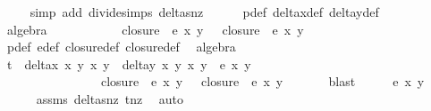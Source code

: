 \begin{isabellebody}
\ \ \ \ \isamarkupfalse%
{\isacharparenleft}simp\ add{\isacharcolon}\ divide{\isacharunderscore}simps\ deltas{\isacharunderscore}nz{\isacharparenright}\isanewline
\ \ \ \ \isamarkupfalse%
\ p{\isacharunderscore}def\ delta{\isacharunderscore}x{\isacharunderscore}def\ delta{\isacharunderscore}y{\isacharunderscore}def\isanewline
\ \ \ \ \isamarkupfalse%
\ algebra\ \ \ \ \isanewline
\ \ \isamarkupfalse%
\ \isamarkupfalse%
\ {\isachardoublequoteopen}{\isachardot}{\isachardot}{\isachardot}\ {\isacharequal}\ closure{}\ {\isacharasterisk}\ e{\isacharprime}\ x{}\ y{}\ {\isacharplus}\ \ closure{}\ {\isacharasterisk}\ e{\isacharprime}\ x{}\ y{}{\isachardoublequoteclose}\isanewline
\ \ \ \ \isamarkupfalse%
\ p{\isacharunderscore}def\ e{\isacharprime}{\isacharunderscore}def\ closure{}{\isacharunderscore}def\ closure{}{\isacharunderscore}def\ \isamarkupfalse%
\ algebra\isanewline
\ \ \isamarkupfalse%
\ \isamarkupfalse%
\ {\isachardoublequoteopen}t{\isacharcircum}{}\ {\isacharasterisk}\ {\isacharparenleft}delta{\isacharunderscore}x\ x{}\ y{}\ x{}\ y{}{\isacharparenright}{\isacharcircum}{}\ {\isacharasterisk}\ {\isacharparenleft}delta{\isacharunderscore}y\ x{}\ y{}\ x{}\ y{}{\isacharparenright}{\isacharcircum}{}\ {\isacharasterisk}\ e{\isacharprime}\ x{}\ y{}\ {\isacharequal}\isanewline
\ \ \ \ \ \ \ \ \ \ \ \ \ \ \ \ closure{}\ {\isacharasterisk}\ e{\isacharprime}\ x{}\ y{}\ {\isacharplus}\ \ closure{}\ {\isacharasterisk}\ e{\isacharprime}\ x{}\ y{}{\isachardoublequoteclose}\ \isanewline
\ \ \ \ \isamarkupfalse%
\ blast\isanewline
\isanewline
\ \ \isamarkupfalse%
\ \isamarkupfalse%
\ {\isachardoublequoteopen}e{\isacharprime}\ x{}\ y{}\ {\isacharequal}\ {}{\isachardoublequoteclose}\isanewline
\ \ \ \ \isamarkupfalse%
\ assms{\isacharparenleft}{}{\isacharcomma}{}{\isacharparenright}\ deltas{\isacharunderscore}nz\ t{\isacharunderscore}nz\ \isamarkupfalse%
\ auto\ \ \isanewline
{}\isamarkupfalse%
%
\endisatagproof
{\isafoldproof}%
%
\isadelimproof

\end{isabellebody}
